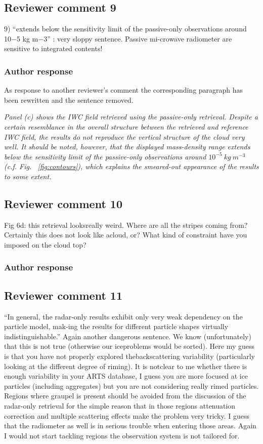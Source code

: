 \documentclass[11pt]{scrartcl}
\begin{document}
\subsection*{Reviewer comment 9}
9) “extends below the sensitivity limit of the passive-only observations around 10−5 kg m−3” : very sloppy sentence. Passive mi-crowave radiometer are sensitive to integrated contents! 

\subsubsection*{Author response}

As response to another reviewer's comment the corresponding paragraph has been rewritten
and the sentence removed.

{\itshape  Panel (c) shows the IWC field retrieved using the passive-only
  retrieval. Despite a certain resemblance in the overall structure between the
  retrieved and reference IWC field, the results do not reproduce the vertical
  structure of the cloud very well. It should be noted, however, that the
  displayed mass-density range extends below the sensitivity limit of the
  passive-only observations around $10^{-5}\ \unit{kg\ m^{-3}}$ (c.f. Fig.
  ~\ref{fig:contours}), which explains the smeared-out appearance of the results
  to some extent. }


\subsection*{Reviewer comment 10}
 Fig 6d: this retrieval looksreally weird. Where are all the stripes coming from? Certainly this does not look like acloud, or? What kind of constraint have you imposed on the cloud top?

\subsubsection*{Author response}

\subsection*{Reviewer comment 11}
“In general, the radar-only results exhibit only very weak dependency on the particle model, mak-ing the results for different particle shapes virtually indistinguishable.”  Again another dangerous sentence.  We know (unfortunately) that this is not true (otherwise our iceproblems would be sorted). Here my guess is that you have not properly explored thebackscattering variability (particularly looking at the different degree of riming). It is notclear to me whether there is enough variability in your ARTS database, I guess you are more focused at ice particles (including aggregates) but you are not considering really rimed particles. Regions where graupel is present should be avoided from the discussion of the radar-only retrieval for the simple reason that in those regions attenuation correction and multiple scattering effects make the problem very tricky. I guess that the radiometer as well is in serious trouble when entering those areas.  Again I would not start tackling regions the observation system is not tailored for. 
\end{document}
